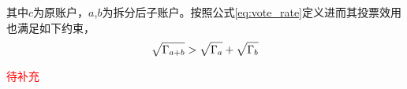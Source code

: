 其中$c$为原账户，$a$,$b$为拆分后子账户。按照公式\ref{eq:vote_rate}定义进而其投票效用也满足如下约束，
$$\sqrt{\Gamma_{a+b}}>\sqrt{\Gamma_a}+\sqrt{\Gamma_b}$$


\textcolor{red}{待补充}

	
	
